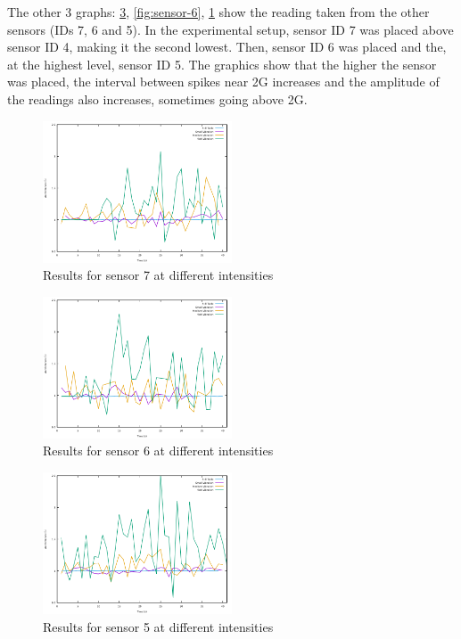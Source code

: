 The other 3 graphs: \ref{fig:sensor-5}, \ref{fig:sensor-6}, \ref{fig:sensor-7} show the reading taken from the other sensors (IDs 7, 6 and 5). In the experimental setup, sensor ID 7 was placed above sensor ID 4, making it 
the second lowest. Then, sensor ID 6 was placed and the, at the highest level, sensor ID 5. The graphics show that the higher the sensor was placed, the interval between spikes near 2G increases and the 
amplitude of the readings also increases, sometimes going above 2G.

\begin{figure}[ht] \centering
  \includegraphics[width=0.5\textwidth]{img/sensor-7-data}
  \caption{Results for sensor 7 at different intensities}
  \label{fig:sensor-7}
\end{figure}

\begin{figure}[ht] \centering
  \includegraphics[width=0.5\textwidth]{img/sensor-6-data}
  \caption{Results for sensor 6 at different intensities}
  \label{fig:sensor-5}
\end{figure}

\begin{figure}[ht] \centering
  \includegraphics[width=0.5\textwidth]{img/sensor-5-data}
  \caption{Results for sensor 5 at different intensities}
  \label{fig:sensor-5}
\end{figure}

